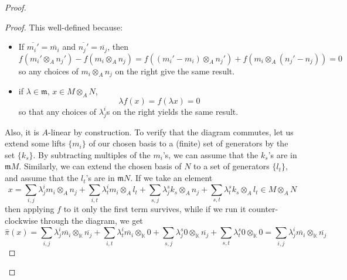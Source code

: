 \begin{problem}
\begin{enumerate}[label=(\theproblem.\arabic*),ref=\theproblem.\arabic*]
\begin{sol}
\begin{proof}
\begin{claim}
\begin{proof}
                                This well-defined because:
                                \begin{itemize}
                                    \item If $\overline{m_i'} = \overline{m_i}$ and $\overline{n_j'} = \overline{n_j}$, then
                                    \[f(m_i' \otimes_A n_j') - f(m_i \otimes_A n_j) = f((m_i' - m_i) \otimes_A n_j') + f(m_i \otimes_A (n_j' - n_j)) = 0\]
                                    so any choices of $m_i \otimes_A n_j$ on the right give the same result.
                                    \item if ${\lambda \in \mathfrak{m}}$, ${x \in M \otimes_A N}$,
                                    \[\lambda f(x) = f(\lambda x) = 0\]
                                    so that any choices of $\lambda^i_j$s on the right yields the same result.
                                \end{itemize}

                                Also, it is $A$-linear by construction.
                                To verify that the diagram commutes, let us extend some lifts $\{m_i\}$ of our chosen basis
                                to a (finite) set of generators by the set $\{k_s\}$.
                                By subtracting multiples of the $m_i$'s, we can assume that the $k_s$'s are in $\mathfrak{m}M$.
                                Similarly, we can extend the chosen basis of $N$ to a set of generators $\{l_t\}$, and assume that the $l_t$'s are in $\mathfrak{m}N$.
                                If we take an element
                                \[
                                    x =
                                    \sum_{i,j} \lambda^i_j m_i \otimes_A n_j +
                                    \sum_{i, t} \lambda^i_t m_i \otimes_A l_t +
                                    \sum_{s, j} \lambda^s_j k_s \otimes_A n_j +
                                    \sum_{s, t} \lambda^s_t k_s \otimes_A l_t
                                    \in M \otimes_A N
                                \]
                                then applying $f$ to it only the first term survives,
                                while if we run it counter-clockwise through the diagram, we get
                                \[
                                    \hat{\pi}(x) =
                                    \sum_{i,j} \lambda^i_j \overline{m_i} \otimes_\mathbb{K} \overline{n_j} +
                                    \sum_{i, t} \lambda^i_t \overline{m_i} \otimes_\mathbb{K} 0 +
                                    \sum_{s, j} \lambda^s_j 0 \otimes_\mathbb{K} \overline{n_j} +
                                    \sum_{s, t} \lambda^s_t 0 \otimes_\mathbb{K} 0
                                    = \sum_{i,j} \lambda^i_j \overline{m_i} \otimes_\mathbb{K} \overline{n_j}
                                \]


\end{proof}
\end{claim}
\end{proof}
\end{sol}
\end{enumerate}
\end{problem}
